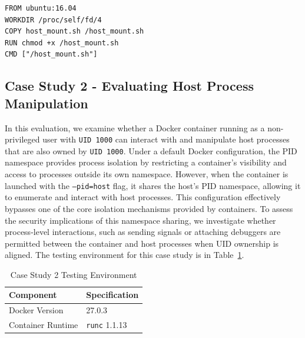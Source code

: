 \vspace{1em}

\begin{listing}[h!]
\caption{Dockerfile for Case Study I}
\label{lst:dockerfile}
\begin{verbatim}
FROM ubuntu:16.04
WORKDIR /proc/self/fd/4
COPY host_mount.sh /host_mount.sh
RUN chmod +x /host_mount.sh
CMD ["/host_mount.sh"]
\end{verbatim}
\end{listing}








\subsection{Case Study 2 - Evaluating Host Process Manipulation}

In this evaluation, we examine whether a Docker container running as a non-privileged user with \texttt{UID 1000} can interact with and manipulate host processes that are also owned by \texttt{UID 1000}. Under a default Docker configuration, the PID namespace provides process isolation by restricting a container's visibility and access to processes outside its own namespace. However, when the container is launched with the \texttt{--pid=host} flag, it shares the host’s PID namespace, allowing it to enumerate and interact with host processes. This configuration effectively bypasses one of the core isolation mechanisms provided by containers. To assess the security implications of this namespace sharing, we investigate whether process-level interactions, such as sending signals or attaching debuggers are permitted between the container and host processes when UID ownership is aligned. The testing environment for this case study is in Table~\ref{table:case2env}.

\begin{table}[h!]
\caption{Case Study 2 Testing Environment\label{table:case2env}}
\centering
\scriptsize %
\begin{tabular}{|l|l|} 
\hline
\textbf{Component} & \textbf{Specification} \\
\hline
Docker Version & 27.0.3 \\
\hline
Container Runtime & \texttt{runc} 1.1.13 \\
\hline
\end{tabular}
\end{table}

